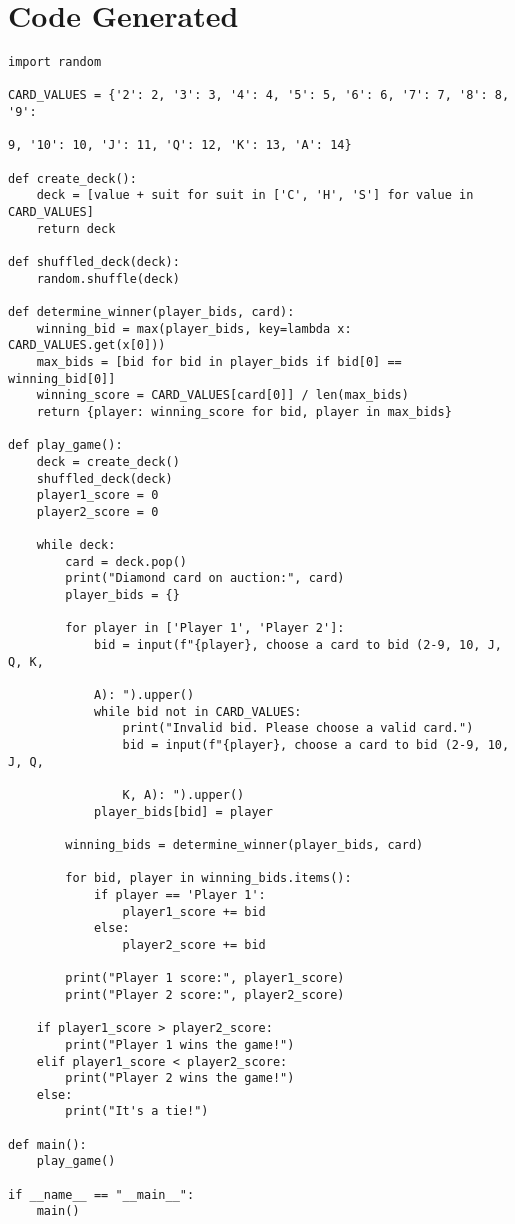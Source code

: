 \documentclass[a4paper]{article}
\begin{document}
\section{Code Generated}
\begin{lstlisting}
import random

CARD_VALUES = {'2': 2, '3': 3, '4': 4, '5': 5, '6': 6, '7': 7, '8': 8, '9': 

9, '10': 10, 'J': 11, 'Q': 12, 'K': 13, 'A': 14}

def create_deck():
    deck = [value + suit for suit in ['C', 'H', 'S'] for value in CARD_VALUES]
    return deck

def shuffled_deck(deck):
    random.shuffle(deck)

def determine_winner(player_bids, card):
    winning_bid = max(player_bids, key=lambda x: CARD_VALUES.get(x[0]))
    max_bids = [bid for bid in player_bids if bid[0] == winning_bid[0]]
    winning_score = CARD_VALUES[card[0]] / len(max_bids)
    return {player: winning_score for bid, player in max_bids}

def play_game():
    deck = create_deck()
    shuffled_deck(deck)
    player1_score = 0
    player2_score = 0
    
    while deck:
        card = deck.pop()
        print("Diamond card on auction:", card)
        player_bids = {}
        
        for player in ['Player 1', 'Player 2']:
            bid = input(f"{player}, choose a card to bid (2-9, 10, J, Q, K, 
            
            A): ").upper()
            while bid not in CARD_VALUES:
                print("Invalid bid. Please choose a valid card.")
                bid = input(f"{player}, choose a card to bid (2-9, 10, J, Q, 
                
                K, A): ").upper()
            player_bids[bid] = player
        
        winning_bids = determine_winner(player_bids, card)
        
        for bid, player in winning_bids.items():
            if player == 'Player 1':
                player1_score += bid
            else:
                player2_score += bid
                
        print("Player 1 score:", player1_score)
        print("Player 2 score:", player2_score)
        
    if player1_score > player2_score:
        print("Player 1 wins the game!")
    elif player1_score < player2_score:
        print("Player 2 wins the game!")
    else:
        print("It's a tie!")

def main():
    play_game()

if __name__ == "__main__":
    main()

\end{lstlisting}
\end{document}
